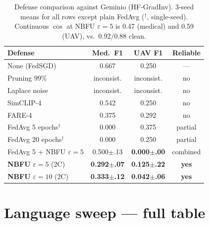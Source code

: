 \documentclass[11pt]{article}
\begin{document}
\begin{table}[h]
\centering
\small
\setlength{\tabcolsep}{4pt}
\begin{tabular}{lccc}
\toprule
Defense & Med.\ F1 & UAV F1 & Reliable \\
\midrule
None (FedSGD)        & 0.667 & 0.250 & --- \\
Pruning 99\%         & inconsist. & inconsist. & no \\
Laplace noise        & inconsist. & inconsist. & no \\
SimCLIP-4            & 0.542 & 0.250 & no \\
FARE-4               & 0.375 & 0.292 & no \\
FedAvg 5 epochs$^\dagger$      & 0.000 & 0.375 & partial \\
FedAvg 20 epochs$^\dagger$     & 0.000 & 0.250 & partial \\
FedAvg 5 + NBFU $\varepsilon{=}5$ & 0.500$\pm$.13 & \textbf{0.000$\pm$.00} & combined \\
\textbf{NBFU} $\varepsilon{=}5$ (2C)  & \textbf{0.292$\pm$.07} & \textbf{0.125$\pm$.22} & \textbf{yes} \\
\textbf{NBFU} $\varepsilon{=}10$ (2C) & \textbf{0.333$\pm$.12} & \textbf{0.042$\pm$.06} & \textbf{yes} \\
\bottomrule
\end{tabular}
\caption{Defense comparison against Geminio (HF-GradInv). 3-seed means for all rows except plain FedAvg ($^\dagger$, single-seed). Continuous $\overline{\cos}$ at NBFU $\varepsilon{=}5$ is 0.47 (medical) and 0.59 (UAV), vs.\ 0.92/0.88 clean.}
\label{tab:defenses}
\end{table}

\section{Language sweep — full table}
\label{app:langsweep}


\end{document}
